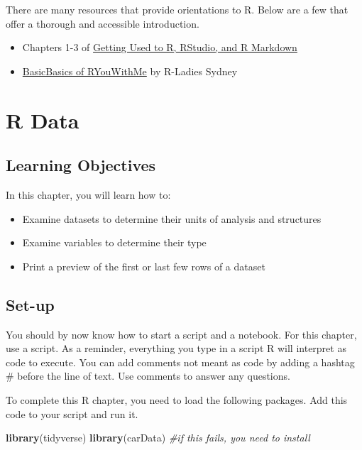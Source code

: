 \documentclass[
]{book}
\newenvironment{Shaded}{\begin{snugshade}}{\end{snugshade}}
\newcommand{\CommentTok}[1]{\textcolor[rgb]{0.56,0.35,0.01}{\textit{#1}}}
\newcommand{\KeywordTok}[1]{\textcolor[rgb]{0.13,0.29,0.53}{\textbf{#1}}}
\newcommand{\NormalTok}[1]{#1}
\providecommand{\tightlist}{%
  \setlength{\itemsep}{0pt}\setlength{\parskip}{0pt}}
\begin{document}
There are many resources that provide orientations to R. Below are a few that offer a thorough and accessible introduction.

\begin{itemize}
\tightlist
\item
  Chapters 1-3 of \href{https://rbasics.netlify.app/index.html}{Getting Used to R, RStudio, and R Markdown}
\item
  \href{https://rladiessydney.org/courses/ryouwithme/01-basicbasics-0/}{BasicBasics of RYouWithMe} by R-Ladies Sydney
\end{itemize}

\hypertarget{r-data}{%
\chapter{R Data}\label{r-data}}

\hypertarget{learning-objectives}{%
\section{Learning Objectives}\label{learning-objectives}}

In this chapter, you will learn how to:

\begin{itemize}
\tightlist
\item
  Examine datasets to determine their units of analysis and structures
\item
  Examine variables to determine their type
\item
  Print a preview of the first or last few rows of a dataset
\end{itemize}

\hypertarget{set-up}{%
\section{Set-up}\label{set-up}}

You should by now know how to start a script and a notebook. For this chapter, use a script. As a reminder, everything you type in a script R will interpret as code to execute. You can add comments not meant as code by adding a hashtag \# before the line of text. Use comments to answer any questions.

To complete this R chapter, you need to load the following packages. Add this code to your script and run it.

\begin{Shaded}
\begin{Highlighting}[]
\KeywordTok{library}\NormalTok{(tidyverse)}
\KeywordTok{library}\NormalTok{(carData)  }\CommentTok{#if this fails, you need to install}
\end{Highlighting}
\end{Shaded}
\end{document}
